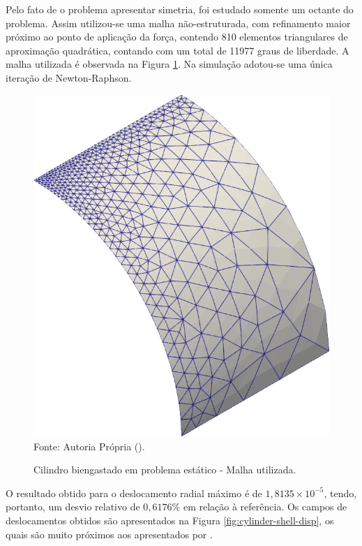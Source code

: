Pelo fato de o problema apresentar simetria, foi estudado somente um octante do problema. Assim utilizou-se uma malha não-estruturada, com refinamento maior próximo ao ponto de aplicação da força, contendo 810 elementos triangulares de aproximação quadrática, contando com um total de 11977 graus de liberdade. A malha utilizada é observada na Figura \ref{fig:cylinder-shell-mesh}. Na simulação adotou-se uma única iteração de Newton-Raphson.

\begin{figure}[h!]
    \centering
    \caption{Cilindro biengastado em problema estático - Malha utilizada.}
    \includegraphics[width=0.3\linewidth]{Figuras/cylinder-shell/mesh1.png}
    \\Fonte: Autoria Própria (\the\year).
    \label{fig:cylinder-shell-mesh}
\end{figure}

O resultado obtido para o deslocamento radial máximo é de $1,8135\times10^{-5}$, tendo, portanto, um desvio relativo de $0,6176\%$ em relação à referência. Os campos de deslocamentos obtidos são apresentados na Figura \ref{fig:cylinder-shell-disp}, os quais são muito próximos aos apresentados por .

